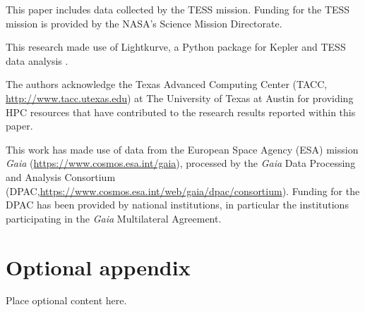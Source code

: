 \documentclass[modern]{aastex631}
\begin{document}
\begin{acknowledgements}
  This paper includes data collected by the TESS mission. Funding for the TESS mission is provided by the NASA's Science Mission Directorate.

  This research made use of Lightkurve, a Python package for Kepler and TESS data analysis \citep{2018ascl.soft12013L}.

  The authors acknowledge the Texas Advanced Computing Center (TACC, \url{http://www.tacc.utexas.edu}) at The University of Texas at Austin for providing HPC resources that have contributed to the research results reported within this paper.

  This work has made use of data from the European Space Agency (ESA) mission {\it Gaia} (\url{https://www.cosmos.esa.int/gaia}), processed by the {\it Gaia} Data Processing and Analysis Consortium (DPAC,\url{https://www.cosmos.esa.int/web/gaia/dpac/consortium}). Funding for the DPAC
  has been provided by national institutions, in particular the institutions
  participating in the {\it Gaia} Multilateral Agreement.

\end{acknowledgements}

\clearpage








\clearpage

\appendix
\restartappendixnumbering

\section{Optional appendix} \label{appendix:tools}

Place optional content here.
\end{document}
